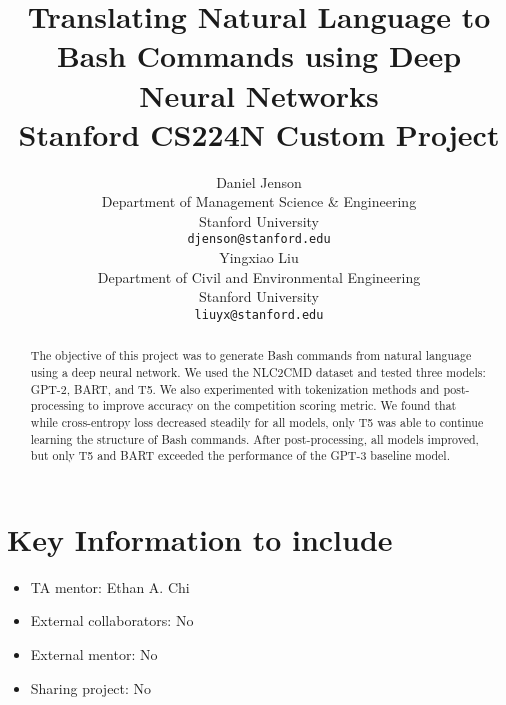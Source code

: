 \documentclass{article}
\title{
  Translating Natural Language to Bash Commands using Deep Neural Networks \\
  \vspace{1em}
  \small{\normalfont Stanford CS224N Custom Project}
}
\author{
 Daniel Jenson \\
  Department of Management Science \& Engineering \\
  Stanford University \\
  \texttt{djenson@stanford.edu} \\
  \And
  Yingxiao Liu \\
  Department of Civil and Environmental Engineering \\
  Stanford University \\
  \texttt{liuyx@stanford.edu} \\
}
\begin{document}
\maketitle

\begin{abstract}
  The objective of this project was to generate Bash commands from natural
  language using a deep neural network. We used the NLC2CMD dataset and tested
  three models: GPT-2, BART, and T5. We also experimented with tokenization methods
  and post-processing to improve accuracy on the competition scoring metric. We
  found that while cross-entropy loss decreased steadily for all models,
  only T5 was able to continue learning the structure of Bash commands. After
  post-processing, all models improved, but only T5 and BART exceeded
  the performance of the GPT-3 baseline model.
\end{abstract}


\section{Key Information to include}
\begin{itemize}
	\item TA mentor: Ethan A. Chi
	\item External collaborators: No
	\item External mentor: No
	\item Sharing project: No
\end{itemize}



\end{document}
